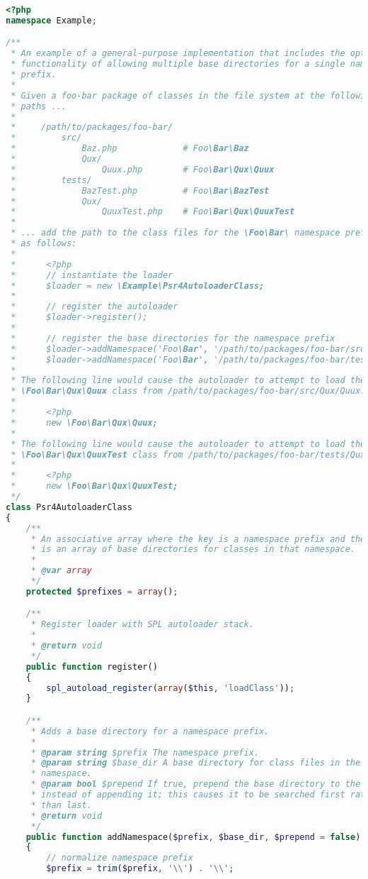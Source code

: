 \begin{lstlisting}[language=PHP]
<?php
namespace Example;

/**
 * An example of a general-purpose implementation that includes the optional
 * functionality of allowing multiple base directories for a single namespace
 * prefix.
 *
 * Given a foo-bar package of classes in the file system at the following
 * paths ...
 *
 *     /path/to/packages/foo-bar/
 *         src/
 *             Baz.php             # Foo\Bar\Baz
 *             Qux/
 *                 Quux.php        # Foo\Bar\Qux\Quux
 *         tests/
 *             BazTest.php         # Foo\Bar\BazTest
 *             Qux/
 *                 QuuxTest.php    # Foo\Bar\Qux\QuuxTest
 *
 * ... add the path to the class files for the \Foo\Bar\ namespace prefix
 * as follows:
 *
 *      <?php
 *      // instantiate the loader
 *      $loader = new \Example\Psr4AutoloaderClass;
 *
 *      // register the autoloader
 *      $loader->register();
 *
 *      // register the base directories for the namespace prefix
 *      $loader->addNamespace('Foo\Bar', '/path/to/packages/foo-bar/src');
 *      $loader->addNamespace('Foo\Bar', '/path/to/packages/foo-bar/tests');
 *
 * The following line would cause the autoloader to attempt to load the
 * \Foo\Bar\Qux\Quux class from /path/to/packages/foo-bar/src/Qux/Quux.php:
 *
 *      <?php
 *      new \Foo\Bar\Qux\Quux;
 *
 * The following line would cause the autoloader to attempt to load the
 * \Foo\Bar\Qux\QuuxTest class from /path/to/packages/foo-bar/tests/Qux/QuuxTest.php:
 *
 *      <?php
 *      new \Foo\Bar\Qux\QuuxTest;
 */
class Psr4AutoloaderClass
{
    /**
     * An associative array where the key is a namespace prefix and the value
     * is an array of base directories for classes in that namespace.
     *
     * @var array
     */
    protected $prefixes = array();

    /**
     * Register loader with SPL autoloader stack.
     *
     * @return void
     */
    public function register()
    {
        spl_autoload_register(array($this, 'loadClass'));
    }

    /**
     * Adds a base directory for a namespace prefix.
     *
     * @param string $prefix The namespace prefix.
     * @param string $base_dir A base directory for class files in the
     * namespace.
     * @param bool $prepend If true, prepend the base directory to the stack
     * instead of appending it; this causes it to be searched first rather
     * than last.
     * @return void
     */
    public function addNamespace($prefix, $base_dir, $prepend = false)
    {
        // normalize namespace prefix
        $prefix = trim($prefix, '\\') . '\\';


\end{lstlisting}
